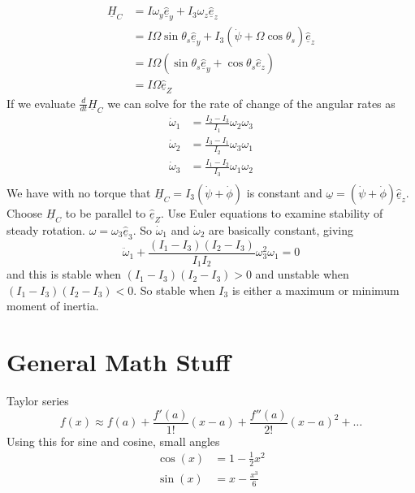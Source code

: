 \documentclass[letterpaper,twocolumn,notitlepage]{article}
\begin{document}
  \begin{equation*}
    \begin{split}
      \underline{H}_{C}&=I\omega_{y}\hat{\underline{e}}_{y}+I_{3}\omega_{z}\hat{\underline{e}}_{z} \\
      &=I\Omega\sin\theta_{s}\hat{\underline{e}}_{y}+I_{3}(\dot{\psi}+\Omega\cos\theta_{s})\hat{\underline{e}}_{z} \\
      &=I\Omega(\sin\theta_{s}\hat{\underline{e}}_{y}+\cos\theta_{s}\hat{e}_{z}) \\
      &=I\Omega\hat{\underline{e}}_{Z}
    \end{split}
  \end{equation*}
  If we evaluate $\frac{d}{dt}\underline{H}_{C}$ we can solve for the rate of change of the angular rates as
  \begin{equation*}
    \begin{split}
      \dot{\omega}_{1}&=\frac{I_{2}-I_{3}}{I_{1}}\omega_{2}\omega_{3} \\
      \dot{\omega}_{2}&=\frac{I_{3}-I_{1}}{I_{2}}\omega_{3}\omega_{1} \\
      \dot{\omega}_{3}&=\frac{I_{1}-I_{2}}{I_{3}}\omega_{1}\omega_{2} \\
    \end{split}
  \end{equation*}
  We have with no torque that $\underline{H}_{C}=I_{3}(\dot{\psi}+\dot{\phi})$ is constant and $\underline{\omega}=(\dot{\psi}+\dot{\phi})\hat{\underline{e}}_{z}$.
  Choose $\underline{H}_{C}$ to be parallel to $\hat{\underline{e}}_{Z}$.
  Use Euler equations to examine stability of steady rotation.
  $\omega=\omega_{3}\hat{\underline{e}}_{3}$.
  So $\dot{\omega}_{1}$ and $\dot{\omega}_{2}$ are basically constant, giving
  \begin{equation*}
    \ddot{\omega}_{1}+\frac{(I_{1}-I_{3})(I_{2}-I_{3})}{I_{1}I_{2}}\omega_{3}^{2}\omega_{1}=0
  \end{equation*}
  and this is stable when $(I_{1}-I_{3})(I_{2}-I_{3})>0$ and unstable when $(I_{1}-I_{3})(I_{2}-I_{3})<0$.
  So stable when $I_{3}$ is either a maximum or minimum moment of inertia.

  \section*{General Math Stuff}

  Taylor series
  \begin{equation*}
    f(x)\approx f(a)+\frac{f'(a)}{1!}(x-a)+\frac{f''(a)}{2!}(x-a)^{2}+\dots
  \end{equation*}
  Using this for sine and cosine, small angles
  \begin{equation*}
    \begin{split}
      \cos(x)&=1-\frac{1}{2}x^{2} \\
      \sin(x)&=x-\frac{x^{3}}{6}
    \end{split}
  \end{equation*}
\end{document}
